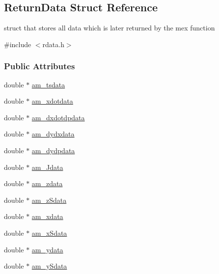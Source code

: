 \hypertarget{struct_return_data}{}\subsection{Return\+Data Struct Reference}
\label{struct_return_data}


struct that stores all data which is later returned by the mex function  




{\ttfamily \#include $<$rdata.\+h$>$}

\subsubsection*{Public Attributes}
\begin{DoxyCompactItemize}
\item 
double $\ast$ \hyperlink{struct_return_data_a577298549da7c9dbe3d93fbf3bc17866}{am\+\_\+tsdata}
\item 
double $\ast$ \hyperlink{struct_return_data_a3ea8fa08fcced0827c1df276b0d253c8}{am\+\_\+xdotdata}
\item 
double $\ast$ \hyperlink{struct_return_data_a494b13e9797d95d7fb3c89e09864aa4f}{am\+\_\+dxdotdpdata}
\item 
double $\ast$ \hyperlink{struct_return_data_a831cada35b4f407a2c8ad789dfc534e5}{am\+\_\+dydxdata}
\item 
double $\ast$ \hyperlink{struct_return_data_a57a7eb2085d8ed5bb6c62331a2aa3af5}{am\+\_\+dydpdata}
\item 
double $\ast$ \hyperlink{struct_return_data_a82d71415ca06c969ebd22a02e4789b1d}{am\+\_\+\+Jdata}
\item 
double $\ast$ \hyperlink{struct_return_data_ab9982c7bbb81e3d54ab0a2f8b6e1ccec}{am\+\_\+zdata}
\item 
double $\ast$ \hyperlink{struct_return_data_a7da81862a5c66dcc9da19fbf34b1bae3}{am\+\_\+z\+Sdata}
\item 
double $\ast$ \hyperlink{struct_return_data_ad99b08eb835733c2416a1a0004e4a491}{am\+\_\+xdata}
\item 
double $\ast$ \hyperlink{struct_return_data_a097369567440c923ac24256e75ab3e89}{am\+\_\+x\+Sdata}
\item 
double $\ast$ \hyperlink{struct_return_data_a24568582aa8de699ea1ce53323ff26ca}{am\+\_\+ydata}
\item 
double $\ast$ \hyperlink{struct_return_data_aa2089cdd16d3cb3c9b85f99f570197d1}{am\+\_\+y\+Sdata}
\item 

\end{DoxyCompactItemize}
